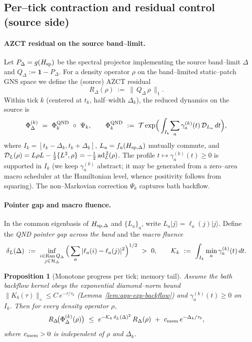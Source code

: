 \documentclass[10pt]{article}
\theoremstyle{definition}
\theoremstyle{plain}
\newtheorem{proposition}{Proposition}[section]
\begin{document}
\subsection*{Per–tick contraction and residual control (source side)}\label{subsec:uom-main-005}

\paragraph{AZCT residual on the source band–limit.}\label{par:uom-main-216}
Let \(P_\Delta=g(H_{{\rm sp}})\) be the spectral projector implementing the source band–limit \(\Delta\) and
\(Q_\Delta:=\mathbf 1-P_\Delta\). For a density operator \(\rho\) on the band–limited static–patch GNS space
we define the (source) AZCT residual
\[
R_\Delta(\rho)\ :=\ \|\,Q_\Delta\,\rho\,\|_1.
\]
Within tick \(k\) (centered at \(t_k\), half–width \(\Delta_k\)), the reduced dynamics on the source is
\[
\Phi_\Delta^{(k)}\ =\ \Phi^{\rm QND}_k\ \circ\ \Psi_k,
\qquad
\Phi^{\rm QND}_k\ :=\ \mathcal T\exp\!\Big(\int_{I_k}\!\sum_a \gamma_a^{(k)}(t)\,\mathcal D_{L_a}\,dt\Big),
\]
where \(I_k=[t_k-\Delta_k,t_k+\Delta_k]\), \(L_a=f_a(H_{{\rm sp},\Delta})\) mutually commute, and
\(\mathcal D_{L}(\rho)=L\rho L-\tfrac12\{L^2,\rho\}=-\tfrac12\,{\rm ad}_L^{\,2}(\rho)\).
The profile \(t\mapsto \gamma_a^{(k)}(t)\ge 0\) is supported in \(I_k\) (we keep \(\gamma_a^{(k)}\) abstract; it may be
generated from a zero–area macro scheduler at the Hamiltonian level, whence positivity follows from squaring).
The non–Markovian correction \(\Psi_k\) captures bath backflow.

\paragraph{Pointer gap and macro fluence.}\label{par:uom-main-217}
In the common eigenbasis of \(H_{{\rm sp},\Delta}\) and \(\{L_a\}_a\), write \(L_a|j\rangle=\ell_a(j)|j\rangle\).
Define the \emph{QND pointer gap across the band} and the \emph{macro fluence}
\[
\delta_L(\Delta)\ :=\ \inf_{\substack{i\in{\rm Ran}\,Q_\Delta\\ j\in\mathcal H_\Delta}}
\Big(\sum_a |\ell_a(i)-\ell_a(j)|^2\Big)^{1/2}\ >\ 0,
\qquad
\mathcal K_k\ :=\ \int_{I_k}\min_a\gamma_a^{(k)}(t)\,dt.
\]

\begin{proposition}[Monotone progress per tick; memory tail]\label{prop:app-tick-progress}
Assume the bath backflow kernel obeys the exponential diamond–norm bound
\(\|K_b(\tau)\|_\diamond\le C\,e^{-\tau/\tau_b}\) (Lemma~\ref{lem:app-exp-backflow}) and
\(\gamma_a^{(k)}(t)\ge 0\) on \(I_k\). Then for every density operator \(\rho\),
\begin{equation}\label{eq:app-tick-contraction}
R_\Delta\!\big(\Phi_\Delta^{(k)}(\rho)\big)
\ \le\ e^{-\mathcal K_k\,\delta_L(\Delta)^2}\,R_\Delta(\rho)\ +\ c_{\rm mem}\,e^{-\Delta_k/\tau_b},
\end{equation}
where \(c_{\rm mem}>0\) is independent of \(\rho\) and \(\Delta_k\).
\end{proposition}
\end{document}
